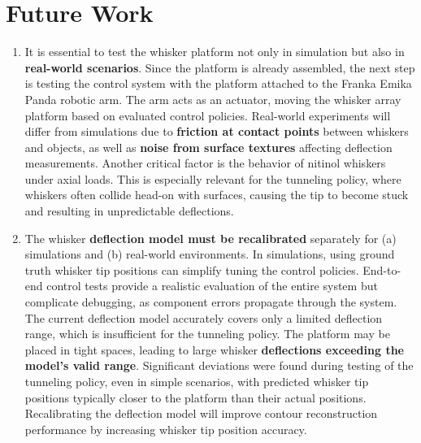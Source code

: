 \section{Future Work}
\begin{enumerate}
    \item It is essential to test the whisker platform not only in simulation but also in \textbf{real-world scenarios}.
    Since the platform is already assembled, the next step is testing the control system with the platform attached to the Franka Emika Panda robotic arm.
    The arm acts as an actuator, moving the whisker array platform based on evaluated control policies.
    Real-world experiments will differ from simulations due to \textbf{friction at contact points} between whiskers and objects, as well as \textbf{noise from surface textures} affecting deflection measurements.
    Another critical factor is the behavior of nitinol whiskers under axial loads.
    This is especially relevant for the tunneling policy, where whiskers often collide head-on with surfaces, causing the tip to become stuck and resulting in unpredictable deflections.

    \item The whisker \textbf{deflection model must be recalibrated} separately for (a) simulations and (b) real-world environments.
    In simulations, using ground truth whisker tip positions can simplify tuning the control policies.
    End-to-end control tests provide a realistic evaluation of the entire system but complicate debugging, as component errors propagate through the system.
    The current deflection model accurately covers only a limited deflection range, which is insufficient for the tunneling policy.
    The platform may be placed in tight spaces, leading to large whisker \textbf{deflections exceeding the model’s valid range}.
    Significant deviations were found during testing of the tunneling policy, even in simple scenarios, with predicted whisker tip positions typically closer to the platform than their actual positions.
    Recalibrating the deflection model will improve contour reconstruction performance by increasing whisker tip position accuracy.
\end{enumerate}



